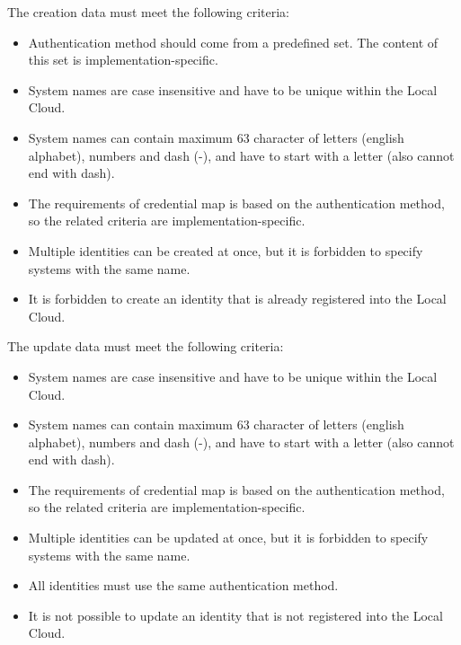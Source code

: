 \documentclass[a4paper]{arrowhead}
\begin{document}

The creation data must meet the following criteria:

\begin{itemize}
    \item Authentication method should come from a predefined set. The content of this set is implementation-specific.
    \item System names are case insensitive and have to be unique within the Local Cloud.
    \item System names can contain maximum 63 character of letters (english alphabet), numbers and dash (-), and have to start with a letter (also cannot end with dash).
    \item The requirements of credential map is based on the authentication method, so the related criteria are implementation-specific.
    \item Multiple identities can be created at once, but it is forbidden to specify systems with the same name.
    \item It is forbidden to create an identity that is already registered into the Local Cloud.
\end{itemize}


The update data must meet the following criteria:

\begin{itemize}
    \item System names are case insensitive and have to be unique within the Local Cloud.
    \item System names can contain maximum 63 character of letters (english alphabet), numbers and dash (-), and have to start with a letter (also cannot end with dash).
    \item The requirements of credential map is based on the authentication method, so the related criteria are implementation-specific.
    \item Multiple identities can be updated at once, but it is forbidden to specify systems with the same name.
    \item All identities must use the same authentication method.
    \item It is not possible to update an identity that is not registered into the Local Cloud.
\end{itemize}
\end{document}
